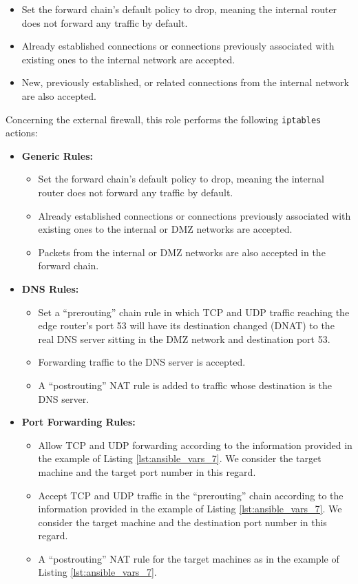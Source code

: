 \begin{itemize}
    \item Set the forward chain's default policy to drop, meaning the internal router does not forward any traffic by default.
    \item Already established connections or connections previously associated with existing ones to the internal network are accepted.
    \item New, previously established, or related connections from the internal network are also accepted.
\end{itemize}

Concerning the external firewall, this role performs the following \texttt{iptables} actions:

\begin{itemize}
    \item \textbf{Generic Rules:}
        \begin{itemize}
            \item Set the forward chain's default policy to drop, meaning the internal router does not forward any traffic by default.
            \item Already established connections or connections previously associated with existing ones to the internal or DMZ networks are accepted.
            \item Packets from the internal or DMZ networks are also accepted in the forward chain.
        \end{itemize}
    \item \textbf{DNS Rules:}
        \begin{itemize}
            \item Set a ``prerouting'' chain rule in which TCP and UDP traffic reaching the edge router's port 53 will have its destination changed (DNAT) to the real DNS server sitting in the DMZ network and destination port 53.
            \item Forwarding traffic to the DNS server is accepted.
            \item A ``postrouting'' NAT rule is added to traffic whose destination is the DNS server.
        \end{itemize}
    \item \textbf{Port Forwarding Rules:}
        \begin{itemize}
            \item Allow TCP and UDP forwarding according to the information provided in the example of Listing \ref{lst:ansible_vars_7}. We consider the target machine and the target port number in this regard.
            \item Accept TCP and UDP traffic in the ``prerouting'' chain according to the information provided in the example of Listing \ref{lst:ansible_vars_7}. We consider the target machine and the destination port number in this regard.
            \item A ``postrouting'' NAT rule for the target machines as in the example of Listing \ref{lst:ansible_vars_7}.
        \end{itemize}
\end{itemize}

